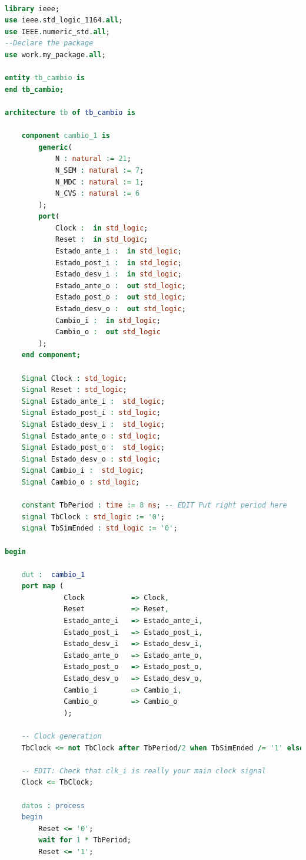 		\begin{lstlisting}[language = vhdl,caption=Testbench del módulo de la máquina de cambios,label={lst:test_cambios}] 
				
library ieee;
use ieee.std_logic_1164.all;
use IEEE.numeric_std.all;
--Declare the package
use work.my_package.all;

entity tb_cambio is
end tb_cambio;

architecture tb of tb_cambio is

    component cambio_1 is
		generic(
			N : natural := 21;
			N_SEM : natural := 7;
			N_MDC : natural := 1;
			N_CVS : natural := 6
		);
		port(
			Clock :  in std_logic;
			Reset :  in std_logic;
			Estado_ante_i :  in std_logic;
			Estado_post_i :  in std_logic;
			Estado_desv_i :  in std_logic;
			Estado_ante_o :  out std_logic;
			Estado_post_o :  out std_logic;
			Estado_desv_o :  out std_logic;
			Cambio_i :  in std_logic;
			Cambio_o :  out std_logic
		);
    end component;

    Signal Clock : std_logic;
	Signal Reset : std_logic;
	Signal Estado_ante_i :  std_logic;
	Signal Estado_post_i : std_logic;
	Signal Estado_desv_i :  std_logic;
	Signal Estado_ante_o : std_logic;
	Signal Estado_post_o :  std_logic;
	Signal Estado_desv_o : std_logic;
	Signal Cambio_i :  std_logic;
	Signal Cambio_o : std_logic;

    constant TbPeriod : time := 8 ns; -- EDIT Put right period here
    signal TbClock : std_logic := '0';
    signal TbSimEnded : std_logic := '0';

begin

    dut :  cambio_1
    port map (
			  Clock           => Clock,
              Reset           => Reset,
			  Estado_ante_i   => Estado_ante_i,
			  Estado_post_i   => Estado_post_i,
			  Estado_desv_i   => Estado_desv_i,
			  Estado_ante_o   => Estado_ante_o,
			  Estado_post_o   => Estado_post_o,
			  Estado_desv_o   => Estado_desv_o,
			  Cambio_i        => Cambio_i,
			  Cambio_o        => Cambio_o
			  );

    -- Clock generation
    TbClock <= not TbClock after TbPeriod/2 when TbSimEnded /= '1' else '0';

    -- EDIT: Check that clk_i is really your main clock signal
    Clock <= TbClock;

    datos : process
    begin
        Reset <= '0';
		wait for 1 * TbPeriod;
		Reset <= '1';
		

\end{lstlisting}
